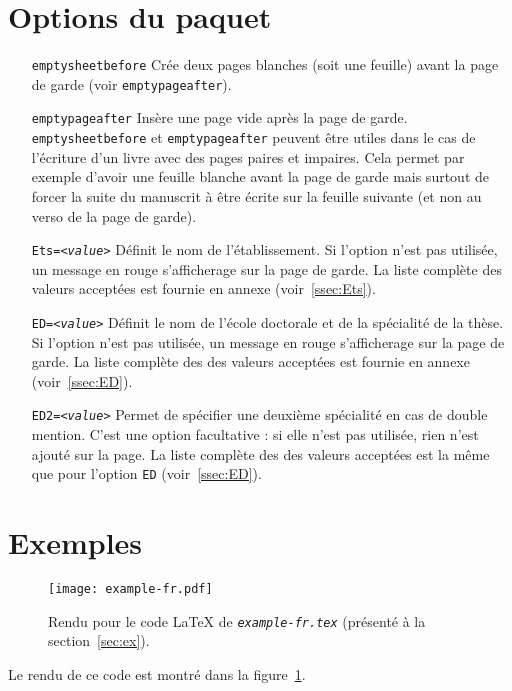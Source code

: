 \documentclass{scrartcl}
\newcommand*{\opt}[1]{\texttt{#1}}
\newcommand*{\file}[1]{\textit{\texttt{#1}}}
\begin{document}
\section{Options du paquet}
\begin{enumerate}
	\item[\opt{emptysheetbefore}] Cr\'ee deux pages blanches (soit une feuille) avant la page de garde (voir \opt{emptypageafter}).
	\item[\opt{emptypageafter}] Ins\`ere une page vide apr\`es la page de garde. \\
		\opt{emptysheetbefore} et \opt{emptypageafter} peuvent \^etre utiles dans le cas de l'\'ecriture
        d'un livre avec des pages paires et impaires.
        Cela permet par exemple d'avoir une feuille blanche avant la page de garde mais surtout de forcer
        la suite du manuscrit \`a \^etre \'ecrite sur la feuille suivante (et non au verso de la page de garde).
    \item[\opt{Ets=\textit{<value>}}] D\'efinit le nom de l'\'etablissement. Si l'option n'est pas utilis\'ee, un message en rouge s'afficherage sur la page de garde. La liste compl\`ete des valeurs accept\'ees est fournie en annexe (voir~\ref{ssec:Ets}).
    \item[\opt{ED=\textit{<value>}}] D\'efinit le nom de l'\'ecole doctorale et de la sp\'ecialit\'e de la th\`ese. Si l'option n'est pas utilis\'ee, un message en rouge s'afficherage sur la page de garde. La liste compl\`ete des des valeurs accept\'ees est fournie en annexe (voir~\ref{ssec:ED}).
    \item[\opt{ED2=\textit{<value>}}] Permet de spécifier une deuxième spécialité en cas de double mention. C'est une option facultative : si elle n'est pas utilis\'ee, rien n'est ajout\'e sur la page. La liste compl\`ete des des valeurs accept\'ees est la m\^eme que pour l'option \opt{ED} (voir~\ref{ssec:ED}).
\end{enumerate}

\section{Exemples\label{sec:ex}}

\begin{figure}[h!]
    \centering
    \texttt{[image: example-fr.pdf]}
    \caption{\label{fig:ex}
        Rendu pour le code \LaTeX{} de \file{example-fr.tex} (pr\'esent\'e \`a la section~\ref{sec:ex}).
    }
\end{figure}
Le rendu de ce code est montr\'e dans la figure~\ref{fig:ex}.
\end{document}
